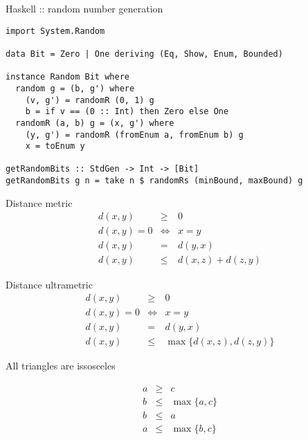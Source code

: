 \documentclass{beamer}
\begin{document}
\begin{frame}[fragile]{Haskell :: random number generation}
\begin{verbatim}
import System.Random

data Bit = Zero | One deriving (Eq, Show, Enum, Bounded)

instance Random Bit where
  random g = (b, g') where
    (v, g') = randomR (0, 1) g
    b = if v == (0 :: Int) then Zero else One
  randomR (a, b) g = (x, g') where
    (y, g') = randomR (fromEnum a, fromEnum b) g
    x = toEnum y

getRandomBits :: StdGen -> Int -> [Bit]
getRandomBits g n = take n $ randomRs (minBound, maxBound) g
\end{verbatim}
\end{frame}

\begin{frame}{Distance metric}
  \begin{eqnarray*}
    d(x, y) & \ge & 0\\
    d(x, y) = 0 & \Leftrightarrow & x = y\\
    d(x, y) &=& d(y, x)\\
    d(x, y) & \le & d(x, z) + d(z, y)
  \end{eqnarray*}
\end{frame}

\begin{frame}{Distance ultrametric}
  \begin{eqnarray*}
    d(x, y) & \ge & 0\\
    d(x, y) = 0 & \Leftrightarrow & x = y\\
    d(x, y) &=& d(y, x)\\
    d(x, y) & \le & \max\{d(x, z),d(z, y)\}
  \end{eqnarray*}
\end{frame}

\begin{frame}{All triangles are issosceles}
  \begin{center}
  \end{center}
  \pause
  \begin{eqnarray*}
    a & \ge & c\\
    b & \le & \max\{a, c\}\\
    b & \le & a\\
    a & \le & \max\{b, c\}
  \end{eqnarray*}
\end{frame}
\end{document}
